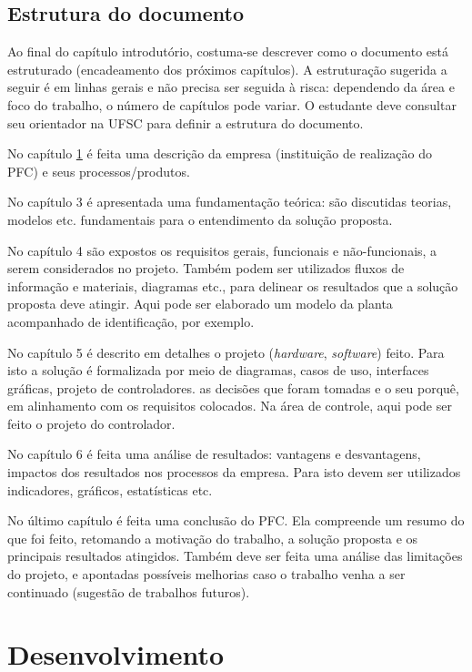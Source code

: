 \section*{Estrutura do documento}

Ao final do capítulo introdutório, costuma-se descrever como o documento está estruturado (encadeamento dos próximos capítulos). A estruturação sugerida a seguir é em linhas gerais e não precisa ser seguida à risca: dependendo da área e foco do trabalho, o número de capítulos pode variar. O estudante deve consultar seu orientador na UFSC para definir a estrutura do documento.

No capítulo \ref{cap:desenvolvimento} é feita uma descrição da empresa (instituição de realização do PFC) e seus processos/produtos.

No capítulo 3 é apresentada uma fundamentação teórica: são discutidas teorias, modelos etc. fundamentais para o entendimento da solução proposta.

No capítulo 4 são expostos os requisitos gerais, funcionais e não-funcionais, a serem considerados no projeto. Também podem ser utilizados fluxos de informação e materiais, diagramas etc., para delinear os resultados que a solução proposta deve atingir. Aqui pode ser elaborado um modelo da planta acompanhado de identificação, por exemplo.

No capítulo 5 é descrito em detalhes o projeto (\emph{hardware}, \emph{software}) feito. Para isto a solução é formalizada por meio de diagramas, casos de uso, interfaces gráficas, projeto de controladores. as decisões que foram tomadas e o seu porquê, em alinhamento com os requisitos colocados. Na área de controle, aqui pode ser feito o projeto do controlador.

No capítulo 6 é feita uma análise de resultados: vantagens e desvantagens, impactos dos resultados nos processos da empresa. Para isto devem ser utilizados indicadores, gráficos, estatísticas etc.

No último capítulo é feita uma conclusão do PFC. Ela compreende um resumo do que foi feito, retomando a motivação do trabalho, a solução proposta e os principais resultados atingidos. Também deve ser feita uma análise das limitações do projeto, e apontadas possíveis melhorias caso o trabalho venha a ser continuado (sugestão de trabalhos futuros).

\chapter{Desenvolvimento}\label{cap:desenvolvimento}

